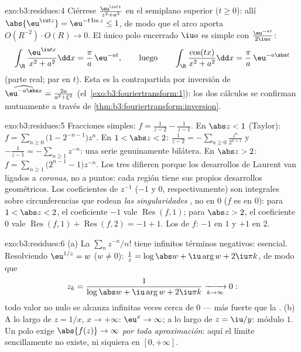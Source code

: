 \begin{solution}{exo:b3:residues:4}
Ciérrese $\frac{\eu^{\iu tz}}{z^2 + a^2}$ en el semiplano superior
($t \geq 0$): allí $\abs{\eu^{\iu tz}} =
\eu^{-t\operatorname{Im}z} \leq 1$, de modo que el arco aporta
$O(R^{-2})\cdot O(R) \to 0$. El único polo encerrado $\iu a$ es simple
con 
$\frac{\eu^{-at}}{2\iu a}$:
\[
\int_\R\frac{\eu^{\iu tx}}{x^2 + a^2}\dd x =
\frac{\pi}{a}\,\eu^{-at},
\qquad\text{luego}\qquad
\int_\R\frac{\cos(tx)}{x^2+a^2}\dd x = \frac\pi
a\,\eu^{-a\abs t}
\]
(parte real; par en $t$). Esta es la contrapartida por inversión de
$\widehat{\eu^{-a\abs x}} = \frac{2a}{a^2+\xi^2}$
(el~\cref{exo:b3:fouriertransform:1}): los dos cálculos se confirman
mutuamente a través de
\cref{thm:b3:fouriertransform:inversion}.
\end{solution}

\begin{solution}{exo:b3:residues:5}
Fracciones simples: $f = \frac1{z-2} - \frac1{z-1}$. En $\abs z < 1$
(Taylor):
$f = \sum_{n\geq0}\bigl(1 - 2^{-n-1}\bigr)z^n$.
En $1 < \abs z < 2$: $\frac1{z-2} =
-\sum_{n\geq0}\frac{z^n}{2^{n+1}}$ y $-\frac1{z-1} =
-\sum_{n\geq1}z^{-n}$: una serie genuinamente bilátera. En $\abs z > 2$:
$f = \sum_{n\geq1}\bigl(2^{n-1} -
1\bigr)z^{-n}$. Los tres difieren porque los desarrollos de Laurent van
ligados a \emph{coronas}, no a puntos: cada región tiene sus propios
desarrollos geométricos. Los coeficientes de $z^{-1}$ ($-1$ y $0$,
respectivamente) son integrales sobre circunferencias que rodean
\emph{las singularidades }, no
 en $0$ ($f$ es
 en $0$): para
$1 < \abs z < 2$, el coeficiente $-1$ vale $\operatorname{Res}(f, 1)$;
para $\abs z > 2$, el coeficiente $0$ vale $\operatorname{Res}(f,1) +
\operatorname{Res}(f,2) = -1 + 1$. Los
 de $f$: $-1$ en $1$ y
$+1$ en $2$.
\end{solution}

\begin{solution}{exo:b3:residues:6}
(a) La 
$\sum_nz^{-n}/n!$ tiene infinitos términos negativos: esencial.
Resolviendo $\eu^{1/z} = w$ ($w \neq
0$): $\frac1z = \log\abs w + \iu\arg w + 2\iu\pi k$, de modo que
\[
z_k = \frac1{\log\abs w + \iu\arg w + 2\iu\pi k}
\xrightarrow[k\to\infty]{} 0 :
\]
todo valor no nulo se alcanza infinitas veces cerca de $0$ --- más
fuerte que la . (b) A lo largo de
$z = 1/x$, $x \to +\infty$: $\eu^x \to \infty$; a lo largo de
$z = \iu/y$: módulo $1$. Un polo exige $\abs{f(z)} \to \infty$ \emph{por
toda aproximación}: aquí el límite sencillamente no existe, ni siquiera
en $[0, +\infty]$.
\end{solution}


